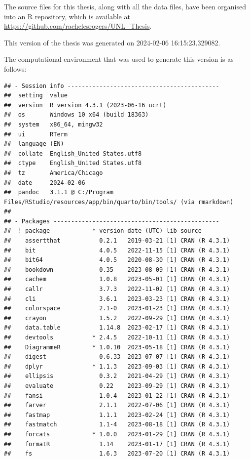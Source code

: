 \documentclass[print]{nuthesis}
\begin{document}
The source files for this thesis, along with all the data files, have been organised into an R repository, which is available at \url{https://github.com/rachelesrogers/UNL_Thesis}.

This version of the thesis was generated on 2024-02-06 16:15:23.329082.

The computational environment that was used to generate this version is as follows:

\begin{verbatim}
## - Session info -------------------------------------------
##  setting  value
##  version  R version 4.3.1 (2023-06-16 ucrt)
##  os       Windows 10 x64 (build 18363)
##  system   x86_64, mingw32
##  ui       RTerm
##  language (EN)
##  collate  English_United States.utf8
##  ctype    English_United States.utf8
##  tz       America/Chicago
##  date     2024-02-06
##  pandoc   3.1.1 @ C:/Program Files/RStudio/resources/app/bin/quarto/bin/tools/ (via rmarkdown)
## 
## - Packages -----------------------------------------------
##  ! package            * version date (UTC) lib source
##    assertthat           0.2.1   2019-03-21 [1] CRAN (R 4.3.1)
##    bit                  4.0.5   2022-11-15 [1] CRAN (R 4.3.1)
##    bit64                4.0.5   2020-08-30 [1] CRAN (R 4.3.1)
##    bookdown             0.35    2023-08-09 [1] CRAN (R 4.3.1)
##    cachem               1.0.8   2023-05-01 [1] CRAN (R 4.3.1)
##    callr                3.7.3   2022-11-02 [1] CRAN (R 4.3.1)
##    cli                  3.6.1   2023-03-23 [1] CRAN (R 4.3.1)
##    colorspace           2.1-0   2023-01-23 [1] CRAN (R 4.3.1)
##    crayon               1.5.2   2022-09-29 [1] CRAN (R 4.3.1)
##    data.table           1.14.8  2023-02-17 [1] CRAN (R 4.3.1)
##    devtools           * 2.4.5   2022-10-11 [1] CRAN (R 4.3.1)
##    DiagrammeR         * 1.0.10  2023-05-18 [1] CRAN (R 4.3.1)
##    digest               0.6.33  2023-07-07 [1] CRAN (R 4.3.1)
##    dplyr              * 1.1.3   2023-09-03 [1] CRAN (R 4.3.1)
##    ellipsis             0.3.2   2021-04-29 [1] CRAN (R 4.3.1)
##    evaluate             0.22    2023-09-29 [1] CRAN (R 4.3.1)
##    fansi                1.0.4   2023-01-22 [1] CRAN (R 4.3.1)
##    farver               2.1.1   2022-07-06 [1] CRAN (R 4.3.1)
##    fastmap              1.1.1   2023-02-24 [1] CRAN (R 4.3.1)
##    fastmatch            1.1-4   2023-08-18 [1] CRAN (R 4.3.1)
##    forcats            * 1.0.0   2023-01-29 [1] CRAN (R 4.3.1)
##    formatR              1.14    2023-01-17 [1] CRAN (R 4.3.1)
##    fs                   1.6.3   2023-07-20 [1] CRAN (R 4.3.1)

\end{verbatim}
\end{document}
